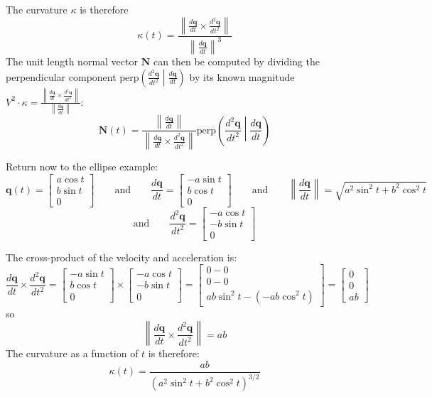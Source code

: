 \documentclass{article}
\begin{document}
The curvature \(\kappa\) is therefore
\[\kappa(t) = \frac{\left\|\frac{d\mathbf{q}}{dt} \times \frac{d^2 \mathbf{q}}{dt^2}\right\|}{\left\|\frac{d\mathbf{q}}{dt}\right\|^3}\]
The unit length normal vector \(\mathbf{N}\) can then be computed by dividing the perpendicular component \(\text{perp}\left(\frac{d^2 \mathbf{q}}{dt^2}\middle|\frac{d\mathbf{q}}{dt}\right)\) by its known magnitude \(V^2 \cdot \kappa = \frac{\left\|\frac{d\mathbf{q}}{dt} \times \frac{d^2 \mathbf{q}}{dt^2}\right\|}{\left\|\frac{d\mathbf{q}}{dt}\right\|}\):
\[\mathbf{N}(t) = \frac{\left\|\frac{d\mathbf{q}}{dt}\right\|}{\left\|\frac{d\mathbf{q}}{dt} \times \frac{d^2 \mathbf{q}}{dt^2}\right\|}\text{perp}\left(\frac{d^2 \mathbf{q}}{dt^2}\middle|\frac{d\mathbf{q}}{dt}\right)\]



Return now to the ellipse example:
\[\mathbf{q}(t) = \begin{bmatrix} a \cos t \\ b \sin t \\ 0 \end{bmatrix} \quad\quad\text{and}\quad\quad \frac{d\mathbf{q}}{dt} = \begin{bmatrix} -a \sin t \\ b \cos t \\ 0 \end{bmatrix} \quad\quad\text{and}\quad\quad \left\|\frac{d\mathbf{q}}{dt}\right\| = \sqrt{a^2\sin^2 t + b^2 \cos^2 t}\]
\[\quad\quad\text{and}\quad\quad \frac{d^2\mathbf{q}}{dt^2} = \begin{bmatrix} -a \cos t \\ -b \sin t \\ 0 \end{bmatrix}\]

The cross-product of the velocity and acceleration is:
\[\frac{d\mathbf{q}}{dt} \times \frac{d^2\mathbf{q}}{dt^2} = \begin{bmatrix} -a \sin t \\ b \cos t \\ 0 \end{bmatrix} \times \begin{bmatrix} -a \cos t \\ -b \sin t \\ 0 \end{bmatrix} 
= \begin{bmatrix} 0 - 0 \\ 0 - 0 \\ ab\sin^2 t - (-ab\cos^2 t) \end{bmatrix} = \begin{bmatrix} 0 \\ 0 \\ ab \end{bmatrix}\]
so 
\[\left\|\frac{d\mathbf{q}}{dt} \times \frac{d^2\mathbf{q}}{dt^2}\right\| = ab\]
The curvature as a function of \(t\) is therefore:
\[\kappa(t) = \frac{ab}{(a^2\sin^2 t + b^2 \cos^2 t)^{3/2}}\] 
\end{document}
